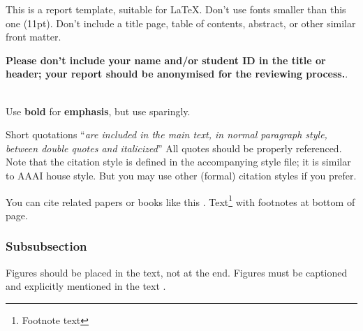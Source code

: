 \documentclass[11pt]{article}
\begin{document}



This is a report template, suitable for \LaTeX. Don't use fonts smaller than this one (11pt). Don't include a title page,
table of contents, abstract, or other similar front matter.

\textbf{Please don't include your name and/or student ID in the title or header; your report should be anonymised for the reviewing process.}.

\ \\ Use \textbf{bold} for \textbf{emphasis}, but use sparingly. 

Short quotations ``\textit{are included in the main text, in normal paragraph style, between double quotes and italicized}'' All quotes should be properly referenced. Note that the citation style is defined in the accompanying
style file; it is similar to AAAI house style. But you may use other (formal) citation styles if you prefer.

You can cite related papers or books like this \cite{bishop2006pattern}. Text\footnote{Footnote text} with footnotes at bottom of page.
\subsubsection{Subsubsection}

Figures should be placed in the text, not at the end. Figures must be captioned and explicitly mentioned in the text . 
\end{document}
